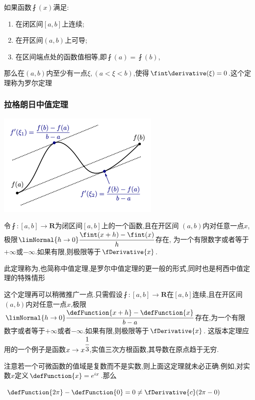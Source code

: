 {{{  如果函数$\fint(x)$满足:

  \begin{enumerate}
    \item 在闭区间$[a,b]$上连续;
    \item 在开区间$(a,b)$上可导;
    \item 在区间端点处的函数值相等,即$\fint(a) = \fint(b)$,
  \end{enumerate}

  那么在$(a,b)$内至少有一点$\xi, (a<\xi<b)$,使得$\fint\derivative(\xi) = 0$.这个定理称为罗尔定理
}%

\subsubsection{拉格朗日中值定理}{
\begin{center}
  \includegraphics{resources/Lagrange's_mean_value_theorem.png}
\end{center}

令$\fint : [a,b] \to \mathbf{R}$为闭区间$[a,b]$上的一个函数,且在开区间
$(a,b)$内对任意一点$x$,极限$\limNormal{h \to 0}\cfrac{\fint(x + h) - \fint(x)}{h}$存在,
为一个有限数字或者等于$+\infty$或$-\infty$.如果有限,则极限等于$\fDerivative{x}$.

此定理称为{},也简称中值定理,是罗尔中值定理的更一般的形式,同时也是柯西中值定理的特殊情形

这个定理再可以稍微推广一点.只需假设$\fint : [a,b] \to \mathbf{R}$在$[a,b]$连续,且在开区间$(a,b)$内对任意一点$x$,极限$\limNormal{h \to 0}
  \cfrac{\defFunction{x + h} - \defFunction{x}}{b - a}$存在,为一个有限数字或者等于$+\infty$或者$-\infty$.如果有限,则极限等于$\fDerivative{x}$.
这版本定理应用的一个例子是函数$x \to x^{\cfrac{1}{3}}$,实值三次方根函数,其导数在原点趋于无穷.

注意若一个可微函数的值域是复数而不是实数,则上面这定理就未必正确.例如,对实数$x$定义$\defFunction{x} = e^{ix}$.那么

$\defFunction{2\pi} - \defFunction{0} = 0 \neq \fDerivative{c}(2\pi - 0)$

}}}
